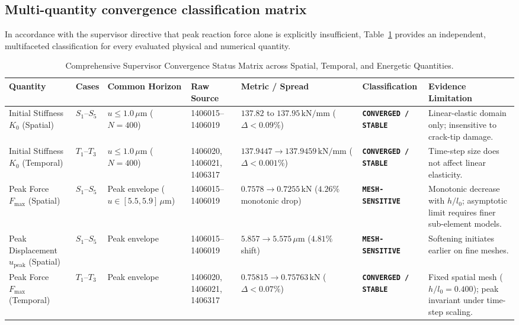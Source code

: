 \subsection{Multi-quantity convergence classification matrix}
In accordance with the supervisor directive that peak reaction force alone is explicitly insufficient, Table~\ref{tab:convergence_status_matrix} provides an independent, multifaceted classification for every evaluated physical and numerical quantity.

\begin{table}[htbp]
\centering
\caption{Comprehensive Supervisor Convergence Status Matrix across Spatial, Temporal, and Energetic Quantities.}
\label{tab:convergence_status_matrix}
\tiny
\setlength{\tabcolsep}{2pt}
\begin{tabularx}{\textwidth}{p{2.2cm}p{1.4cm}p{1.8cm}p{1.7cm}p{2.3cm}p{1.8cm}X}
\toprule
Quantity & Cases & Common Horizon & Raw Source & Metric / Spread & Classification & Evidence Limitation \\
\midrule
Initial Stiffness $K_0$ (Spatial) & $S_1$--$S_5$ & $u \le 1.0\,\mu\mathrm{m}$ ($N=400$) & 1406015--1406019 & $137.82$ to $137.95\,\mathrm{kN/mm}$ ($\Delta < 0.09\%$) & \textbf{\texttt{CONVERGED / STABLE}} & Linear-elastic domain only; insensitive to crack-tip damage. \\
Initial Stiffness $K_0$ (Temporal) & $T_1$--$T_3$ & $u \le 1.0\,\mu\mathrm{m}$ ($N=400$) & 1406020, 1406021, 1406317 & $137.9447 \to 137.9459\,\mathrm{kN/mm}$ ($\Delta < 0.001\%$) & \textbf{\texttt{CONVERGED / STABLE}} & Time-step size does not affect linear elasticity. \\
Peak Force $F_{\max}$ (Spatial) & $S_1$--$S_5$ & Peak envelope ($u \in [5.5, 5.9]\,\mu\mathrm{m}$) & 1406015--1406019 & $0.7578 \to 0.7255\,\mathrm{kN}$ ($4.26\%$ monotonic drop) & \textbf{\texttt{MESH-SENSITIVE}} & Monotonic decrease with $h/l_0$; asymptotic limit requires finer sub-element models. \\
Peak Displacement $u_{\mathrm{peak}}$ (Spatial) & $S_1$--$S_5$ & Peak envelope & 1406015--1406019 & $5.857 \to 5.575\,\mu\mathrm{m}$ ($4.81\%$ shift) & \textbf{\texttt{MESH-SENSITIVE}} & Softening initiates earlier on fine meshes. \\
Peak Force $F_{\max}$ (Temporal) & $T_1$--$T_3$ & Peak envelope & 1406020, 1406021, 1406317 & $0.75815 \to 0.75763\,\mathrm{kN}$ ($\Delta < 0.07\%$) & \textbf{\texttt{CONVERGED / STABLE}} & Fixed spatial mesh ($h/l_0=0.400$); peak invariant under time-step scaling. \\

\end{tabularx}
\end{table}
